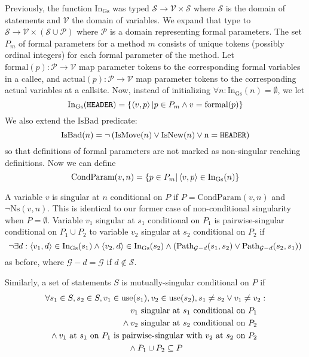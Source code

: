 \documentclass[11pt,notitlepage]{article}
\begin{document}
Previously, the function $\text{In}_\text{Gs}$ was typed
$\mathcal{S\to V\times S}$
where $\mathcal{S}$ is the domain of statements
and $\mathcal{V}$ the domain of variables.
We expand that type to
$\mathcal{S\to V\times (S\cup P)}$ where $\mathcal{P}$ is a domain
representing formal parameters.  The set $P_m$ of formal parameters for
a method $m$ consists of unique tokens (possibly ordinal integers) for
each formal parameter of the method.  Let
$\text{formal}(p):\mathcal{P\to V}$ map parameter tokens to the
corresponding formal variables in a callee, and
$\text{actual}(p):\mathcal{P\to V}$ map parameter tokens to the
corresponding actual variables at a callsite.
Now, instead of initializing $\forall n :
\text{In}_\text{Gs}(n)=\emptyset$, we let
\begin{displaymath}
\text{In}_\text{Gs}(\text{\tt HEADER}) =
   \left\{ \left\langle v,p \right\rangle | p\in P_m \wedge v=\text{formal}(p) \right\}
\end{displaymath}
We also extend the $\text{IsBad}$ predicate:
\begin{displaymath}
\text{IsBad}(n) = \neg\left(\text{IsMove}(n) \vee \text{IsNew}(n) \vee
                            \text n = \text{\tt HEADER} \right)
\end{displaymath}
so that definitions of formal parameters are not marked as
non-singular reaching definitions.  Now we can define
\begin{displaymath}
\text{CondParam}(v,n) =
    \left\{ p\in P_m | \left\langle v,p \right\rangle\in \text{In}_\text{Gs}(n) \right\}
\end{displaymath}

A variable $v$ is singular at $n$ conditional on $P$ if
$P=\text{CondParam}(v,n)$ and $\neg\text{Ns}(v,n)$.  This
is identical to our former case of non-conditional singularity
when $P=\emptyset$.  Variable $v_1$ singular at $s_1$ conditional on
$P_1$ is pairwise-singular conditional on $P_1\cup P_2$ to variable
$v_2$ singular at $s_2$ conditional on $P_2$ if
\begin{displaymath}
\neg\exists 
     d : \left\langle v_1, d \right\rangle \in \text{In}_\text{Gs}(s_1) \wedge
         \left\langle v_2, d \right\rangle \in \text{In}_\text{Gs}(s_2) \wedge
\left(\text{Path}_{\mathcal{G}-d}(s_1, s_2) \vee
      \text{Path}_{\mathcal{G}-d}(s_2, s_1) \right)
\end{displaymath}
as before, where $\mathcal{G}-d=\mathcal{G}$ if $d\notin\mathcal{S}$.

Similarly, a set of statements $S$ is mutually-singular conditional on $P$
if
\begin{multline*}
\forall s_1 \in S, s_2 \in S, v_1 \in \text{use}(s_1), v_2 \in \text{use}(s_2),
  s_1 \neq s_2 \vee v_1 \neq v_2:
\\\shoveright{
v_1 \text{ singular at } s_1 \text{ conditional on } P_1
}\\\shoveright{{}\wedge
v_2 \text{ singular at } s_2 \text{ conditional on } P_2
}\\\shoveright{{}\wedge
v_1 \text{ at } s_1 \text{ on } P_1
\text{ is pairwise-singular with }
v_2 \text{ at } s_2 \text{ on } P_2
}\\{}\wedge
P_1 \cup P_2 \subseteq P
\end{multline*}
\end{document}
